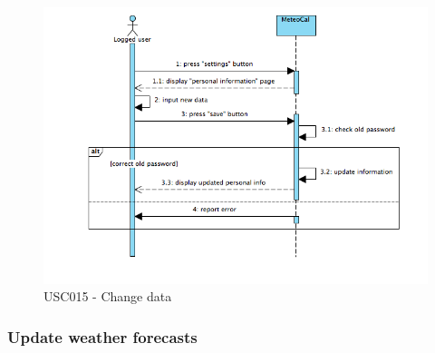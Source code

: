 \documentclass[10pt,a4paper,titlepage]{article}
\begin{document}
\begin{figure}[h]
\centering
\includegraphics[width=\linewidth]{./Sequence_diag/USC015.png}
\caption[USC015]{USC015 - Change data}
\label{fig:USC015}
\end{figure}

\clearpage
\subsubsection{Update weather forecasts} 
\end{document}
